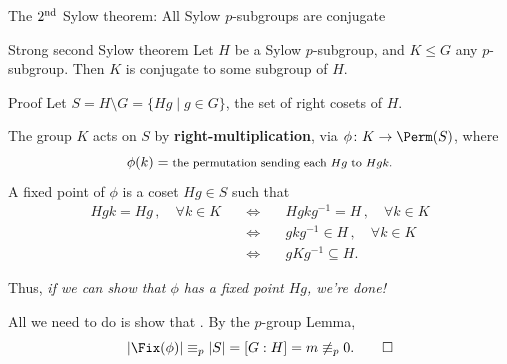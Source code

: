 \documentclass[8pt, handout]{beamer}
\newcommand{\Pause}{}      %
\begin{document}

\begin{frame}{The $2^{\rm nd}$ Sylow theorem: All Sylow $p$-subgroups are 
    conjugate} 

  \begin{block}{Strong second Sylow theorem}
    Let $H$ be a Sylow $p$-subgroup, and $K\leq G$ any
    $p$-subgroup. Then $K$ is conjugate to some subgroup of $H$.
  \end{block}  
  
  \begin{exampleblock}{Proof} %
    Let $S=H\!\setminus\!G=\{Hg\mid g\in G\}$, the set of right cosets of $H$.
    
    \Pause\medskip
    
    The group $K$ acts on $S$ by \textbf{right-multiplication}, via $\phi\colon
    K\to\Perm(S)$, where \vspace{-1mm}
    \[
    \phi(k)=\mbox{\footnotesize the permutation sending each $Hg$ to
      $Hgk$.}
    \]   
    \pause A {\color{xGreen}fixed point} of $\phi$ is a coset $Hg\in S$ such
    that \vspace{-1mm}
    \[
    \renewcommand{\arraystretch}{1.3}
    \begin{array}{lll}
      Hgk=Hg\,,\quad\forall k\in K\Pause\quad & \Longleftrightarrow\quad &
      Hgkg^{-1}=H\,,\quad\forall k\in K
      \\ \Pause \quad &\Longleftrightarrow\quad &
      gkg^{-1}\in H\,,\quad\forall k\in K
      \\ \Pause \quad &\Longleftrightarrow\quad &
      gKg^{-1}\subseteq H.
    \end{array}
    \]

  \Pause

  Thus, \emph{if we can show that $\phi$ has a fixed point $Hg$, we're done!}

  \pause\medskip

  All we need to do is show that
  . \Pause By the $p$-group Lemma,
  \[
  |\Fix(\phi)|\equiv_p|S|=[G:H]=m\not\equiv_p 0. \tag*{$\hfill\Box$}
  \]
  \end{exampleblock}
  
\end{frame}

\end{document}
